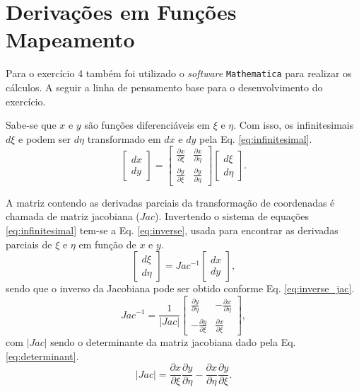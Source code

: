 \section{Deriva\c{c}\~oes em Fun\c{c}\~oes Mapeamento}\label{sec:derivative}
Para o exerc\'icio 4 tamb\'em foi utilizado o \textit{software} \texttt{Mathematica} para realizar os c\'alculos. A seguir a linha de pensamento base para o desenvolvimento do exerc\'icio.

Sabe-se que $x$ e $y$ s\~ao fun\c{c}\~oes diferenci\'aveis em $\xi$ e $\eta$. Com isso, os infinitesimais $d\xi$ e podem ser $d\eta$ transformado em $dx$ e $dy$ pela Eq. \eqref{eq:infinitesimal}.
\begin{equation}
    \begin{bmatrix}
        dx \\
        dy
    \end{bmatrix}
    =
    \begin{bmatrix}
        \frac{\partial x}{\partial \xi} & \frac{\partial x}{\partial \eta} \\
        \frac{\partial y}{\partial \xi} & \frac{\partial y}{\partial \eta}
    \end{bmatrix}
    \begin{bmatrix}
        d\xi\\
        d\eta
    \end{bmatrix}.
    \label{eq:infinitesimal}
\end{equation}

A matriz contendo as derivadas parciais da transforma\c{c}\~ao de coordenadas \'e chamada de matriz jacobiana ($Jac$). Invertendo o sistema de equa\c{c}\~oes \eqref{eq:infinitesimal} tem-se a Eq. \eqref{eq:inverse}, usada para encontrar as derivadas parciais de $\xi$ e $\eta$ em fun\c{c}\~ao de $x$ e $y$.
\begin{equation}
    \begin{bmatrix}
        d\xi\\
        d\eta
    \end{bmatrix}
    =
    Jac^{-1}
    \begin{bmatrix}
        dx \\
        dy
    \end{bmatrix},
    \label{eq:inverse}
\end{equation}
sendo que o inverso da Jacobiana pode ser obtido conforme Eq. \eqref{eq:inverse_jac}.
\begin{equation}
    Jac^{-1} = \frac{1}{|Jac|}
    \begin{bmatrix}
        \frac{\partial y}{\partial \eta} & -\frac{\partial x}{\partial \eta} \\
        -\frac{\partial y}{\partial \xi} & \frac{\partial x}{\partial \xi}
    \end{bmatrix},
    \label{eq:inverse_jac}
\end{equation}
com $|Jac|$ sendo o determinante da matriz jacobiana dado pela Eq. \eqref{eq:determinant}.
\begin{equation}
    |Jac| = \frac{\partial x}{\partial \xi}\frac{\partial y}{\partial \eta} - \frac{\partial x}{\partial \eta}\frac{\partial y}{\partial \xi}.
    \label{eq:determinant}
\end{equation}

